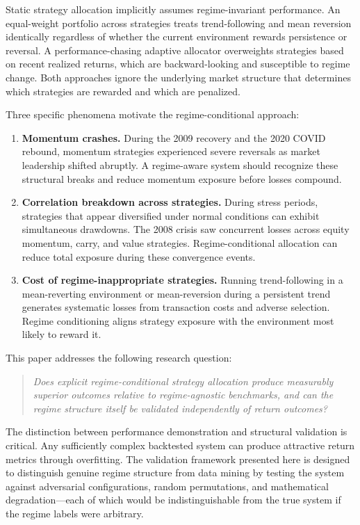 \documentclass[12pt]{article}
\begin{document}
Static strategy allocation implicitly assumes regime-invariant performance.
An equal-weight portfolio across strategies treats trend-following and mean reversion identically regardless of whether the current environment rewards persistence or reversal.
A performance-chasing adaptive allocator overweights strategies based on recent realized returns, which are backward-looking and susceptible to regime change.
Both approaches ignore the underlying market structure that determines which strategies are rewarded and which are penalized.

Three specific phenomena motivate the regime-conditional approach:

\begin{enumerate}
    \item \textbf{Momentum crashes.} During the 2009 recovery and the 2020 COVID rebound, momentum strategies experienced severe reversals as market leadership shifted abruptly. A regime-aware system should recognize these structural breaks and reduce momentum exposure before losses compound.

    \item \textbf{Correlation breakdown across strategies.} During stress periods, strategies that appear diversified under normal conditions can exhibit simultaneous drawdowns. The 2008 crisis saw concurrent losses across equity momentum, carry, and value strategies. Regime-conditional allocation can reduce total exposure during these convergence events.

    \item \textbf{Cost of regime-inappropriate strategies.} Running trend-following in a mean-reverting environment or mean-reversion during a persistent trend generates systematic losses from transaction costs and adverse selection. Regime conditioning aligns strategy exposure with the environment most likely to reward it.
\end{enumerate}

This paper addresses the following research question:

\begin{quote}
\textit{Does explicit regime-conditional strategy allocation produce measurably superior outcomes relative to regime-agnostic benchmarks, and can the regime structure itself be validated independently of return outcomes?}
\end{quote}

The distinction between performance demonstration and structural validation is critical.
Any sufficiently complex backtested system can produce attractive return metrics through overfitting.
The validation framework presented here is designed to distinguish genuine regime structure from data mining by testing the system against adversarial configurations, random permutations, and mathematical degradation---each of which would be indistinguishable from the true system if the regime labels were arbitrary.
\end{document}

